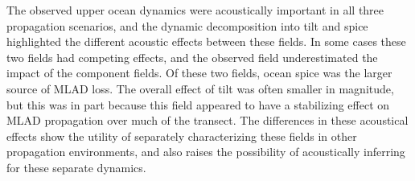 \documentclass[preprint,NumberedRefs]{JASA}
\begin{document}
The observed upper ocean dynamics were acoustically important in all three propagation scenarios, and the dynamic decomposition into tilt and spice highlighted the different acoustic effects between these fields. In some cases these two fields had competing effects, and the observed field underestimated the impact of the component fields. Of these two fields, ocean spice was the larger source of MLAD loss. The overall effect of tilt was often smaller in magnitude, but this was in part because this field appeared to have a stabilizing effect on MLAD propagation over much of the transect. The differences in these acoustical effects show the utility of separately characterizing these fields in other propagation environments, and also raises the possibility of acoustically inferring for these separate dynamics.



\end{document}
